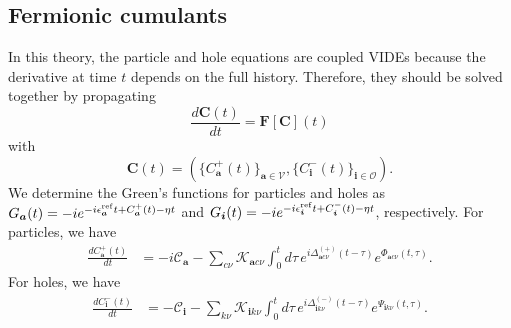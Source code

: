 \subsection{Fermionic cumulants}
In this theory, the particle and hole equations are coupled VIDEs because the derivative at time $t$ depends on the full history. Therefore, they should be solved together by propagating
\begin{equation}
\frac{d\mathbf{C}(t)}{dt}
=
\mathbf{F}[\mathbf{C}](t)
\end{equation}
with
\begin{equation}
\mathbf{C}(t)
=
\left(
\{C_{\bm{a}}^{+}(t)\}_{\bm{a}\in\mathcal{V}},
\{C_{\bm{i}}^{-}(t)\}_{\bm{i}\in\mathcal{O}}
\right).
\end{equation}
 We determine the Green's functions for particles and holes as $G_{\bm{a}}(t)=-i e^{-i\epsilon_{\bm{a}}^{\rm ref}t+C_{\bm{a}}^{+}(t)-\eta t}$ and $G_{\bm{i}}(t)=-i e^{-i\epsilon_{\bm{i}}^{\rm ref}t+C_{\bm{i}}^{-}(t)-\eta t}$, respectively.
For particles, we have
\begin{align}
\frac{dC_{\bm{a}}^{+}(t)}{dt}
&=
-i\mathcal{C}_{\bm{a}}
-
\sum_{c\nu}
\mathcal{K}_{\bm{a}c\nu}
\int_0^t d\tau\,
e^{i\Delta_{\bm{a}c\nu}^{(+)}(t-\tau)}
e^{\Phi_{\bm{a}c\nu}(t,\tau)}.
\end{align}
For holes, we have
\begin{align}
\frac{dC_{\bm{i}}^{-}(t)}{dt}
&= - \mathcal{C}_{\bm{i}}
-
\sum_{k\nu}
\mathcal{K}_{\bm{i}k\nu}
\int_0^t d\tau\,
e^{i\Delta_{\bm{i}k\nu}^{(-)}(t-\tau)}
e^{\Psi_{\bm{i}k\nu}(t,\tau)}.
\end{align}
